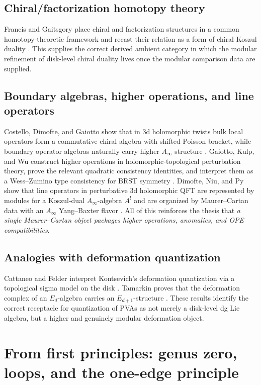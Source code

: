 \subsection{Chiral/factorization homotopy theory}

Francis and Gaitsgory place chiral and factorization structures in a common homotopy-theoretic
framework and recast their relation as a form of chiral Koszul duality
\cite{FG12}. This supplies the correct derived ambient category in which
the modular refinement of disk-level chiral duality lives once the modular comparison data
are supplied.

\subsection{Boundary algebras, higher operations, and line operators}

Costello, Dimofte, and Gaiotto show that in 3d holomorphic twists bulk local operators form
a commutative chiral algebra with shifted Poisson bracket, while boundary operator algebras
naturally carry higher $A_\infty$ structure \cite{CDG20}. Gaiotto,
Kulp, and Wu construct higher operations in holomorphic-topological perturbation theory,
prove the relevant quadratic consistency identities, and interpret them as a Wess--Zumino
type consistency for BRST symmetry \cite{GKW25}. Dimofte, Niu, and Py show
that line operators in perturbative 3d holomorphic QFT are represented by modules for a
Koszul-dual $A_\infty$-algebra $A^!$ and are organized by Maurer--Cartan data with an
$A_\infty$ Yang--Baxter flavor \cite{DNP25}. All of this reinforces the thesis
that \emph{a single Maurer--Cartan object packages higher operations, anomalies,
and OPE compatibilities}.

\subsection{Analogies with deformation quantization}

Cattaneo and Felder interpret Kontsevich's deformation quantization via a topological
sigma model on the disk \cite{CF00}. Tamarkin proves that the deformation
complex of an $E_d$-algebra carries an $E_{d+1}$-structure \cite{Tam02}. These
results identify the correct receptacle for quantization of PVAs as not merely
a disk-level dg Lie algebra, but a higher and genuinely modular deformation object.

\section{From first principles: genus zero, loops, and the one-edge principle}

